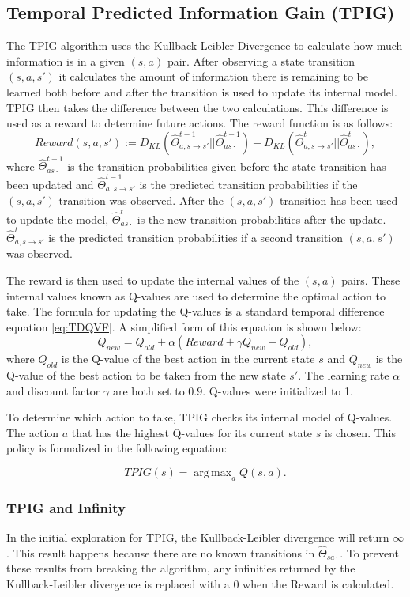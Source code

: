 \documentclass[12pt]{thesis}
\DeclareMathOperator*{\argmax}{arg\,max}
\begin{document}
\subsection{Temporal Predicted Information Gain (TPIG)}
The TPIG algorithm uses the Kullback-Leibler Divergence to calculate how much information is in a given $(s,a)$ pair. After observing a state transition $(s,a,s')$ it calculates the amount of information there is remaining to be learned both before and after the transition is used to update its internal model. TPIG then takes the difference between the two calculations. This difference is used as a reward to determine future actions. The reward function is as follows:
\begin{equation}
	Reward(s,a,s') := D_{KL}(\hat{\Theta}_{a,s \rightarrow s'}^{t-1} || \hat{\Theta}_{as\cdot}^{t-1}) - D_{KL}(\hat{\Theta}_{a,s \rightarrow s'}^{t} || \hat{\Theta}_{as\cdot}^{t}),
\label{eq:TPIGReward}
\end{equation}
where $\hat{\Theta}_{as\cdot}^{t-1}$ is the transition probabilities given before the state transition has been updated and $\hat{\Theta}_{a,s \rightarrow s'}^{t-1}$ is the predicted transition probabilities if the $(s,a,s')$ transition was observed. After the $(s,a,s')$ transition has been used to update the model, $\hat{\Theta}_{as\cdot}^{t}$ is the new transition probabilities after the update. $\hat{\Theta}_{a,s \rightarrow s'}^{t}$ is the predicted transition probabilities if a second transition $(s,a,s')$ was observed.

The reward is then used to update the internal values of the $(s,a)$ pairs. These internal values known as Q-values are used to determine the optimal action to take.
The formula for updating the Q-values is a standard temporal difference equation \eqref{eq:TDQVF}. A simplified form of this equation is shown below:
\[Q_{new} = Q_{old} + \alpha(Reward + \gamma Q_{new} - Q_{old}),\]
where $Q_{old}$ is the Q-value of the best action in the current state $s$ and $Q_{new}$ is the Q-value of the best action to be taken from the new state $s'$. The learning rate $\alpha$ and discount factor $\gamma$ are both set to $0.9$. Q-values were initialized to 1.

To determine which action to take, TPIG checks its internal model of Q-values. The action $a$ that has the highest Q-values for its current state $s$ is chosen. This policy is formalized in the following equation:

\[ TPIG(s) = \argmax_a  Q(s,a).\]

\subsubsection{TPIG and Infinity}
In the initial exploration for TPIG, the Kullback-Leibler divergence will return $\infty$. This result happens because there are no known transitions in $\hat{\Theta}_{sa\cdot}$. To prevent these results from breaking the algorithm, any infinities returned by the Kullback-Leibler divergence is replaced with a 0 when the Reward is calculated.
\end{document}

